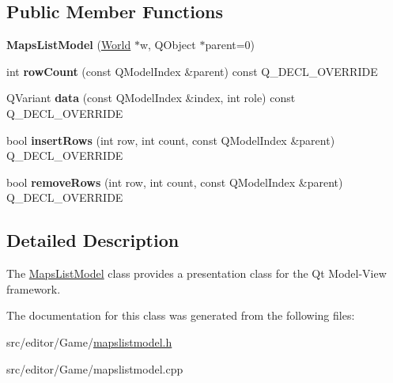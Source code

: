 \subsection*{Public Member Functions}
\begin{DoxyCompactItemize}
\item 
\hypertarget{class_maps_list_model_a217db37a921ecca05b082dee26a5272a}{}\label{class_maps_list_model_a217db37a921ecca05b082dee26a5272a} 
{\bfseries Maps\+List\+Model} (\hyperlink{class_world}{World} $\ast$w, Q\+Object $\ast$parent=0)
\item 
\hypertarget{class_maps_list_model_acec046632c59d580ca1915e70a8cec14}{}\label{class_maps_list_model_acec046632c59d580ca1915e70a8cec14} 
int {\bfseries row\+Count} (const Q\+Model\+Index \&parent) const Q\+\_\+\+D\+E\+C\+L\+\_\+\+O\+V\+E\+R\+R\+I\+DE
\item 
\hypertarget{class_maps_list_model_a3cab7c81a30a41d825bcc7e82d509ce3}{}\label{class_maps_list_model_a3cab7c81a30a41d825bcc7e82d509ce3} 
Q\+Variant {\bfseries data} (const Q\+Model\+Index \&index, int role) const Q\+\_\+\+D\+E\+C\+L\+\_\+\+O\+V\+E\+R\+R\+I\+DE
\item 
\hypertarget{class_maps_list_model_aafdc9fae57291d36d3c6b2754a1bc3a4}{}\label{class_maps_list_model_aafdc9fae57291d36d3c6b2754a1bc3a4} 
bool {\bfseries insert\+Rows} (int row, int count, const Q\+Model\+Index \&parent) Q\+\_\+\+D\+E\+C\+L\+\_\+\+O\+V\+E\+R\+R\+I\+DE
\item 
\hypertarget{class_maps_list_model_a3877cf5da4ec1004e8b867a7fa3599e9}{}\label{class_maps_list_model_a3877cf5da4ec1004e8b867a7fa3599e9} 
bool {\bfseries remove\+Rows} (int row, int count, const Q\+Model\+Index \&parent) Q\+\_\+\+D\+E\+C\+L\+\_\+\+O\+V\+E\+R\+R\+I\+DE
\end{DoxyCompactItemize}


\subsection{Detailed Description}
The \hyperlink{class_maps_list_model}{Maps\+List\+Model} class provides a presentation class for the Qt Model-\/\+View framework. 

The documentation for this class was generated from the following files\+:\begin{DoxyCompactItemize}
\item 
src/editor/\+Game/\hyperlink{mapslistmodel_8h}{mapslistmodel.\+h}\item 
src/editor/\+Game/mapslistmodel.\+cpp\end{DoxyCompactItemize}
